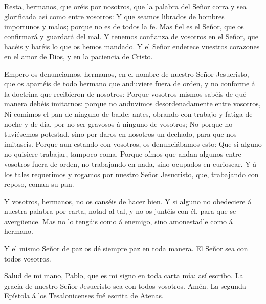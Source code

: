  Resta, hermanos, que oréis por nosotros, que la palabra del
Señor corra y sea glorificada así como entre vosotros:  Y
que seamos librados de hombres importunos y malos; porque no es de todos
la fe.  Mas fiel es el Señor, que os confirmará y guardará
del mal.  Y tenemos confianza de vosotros en el Señor, que
hacéis y haréis lo que os hemos mandado.  Y el Señor
enderece vuestros corazones en el amor de Dios, y en la paciencia de
Cristo.

 Empero os denunciamos, hermanos, en el nombre de nuestro
Señor Jesucristo, que os apartéis de todo hermano que anduviere fuera de
orden, y no conforme á la doctrina que recibieron de nosotros:
 Porque vosotros mismos sabéis de qué manera debéis
imitarnos: porque no anduvimos desordenadamente entre vosotros,
 Ni comimos el pan de ninguno de balde; antes, obrando con
trabajo y fatiga de noche y de día, por no ser gravosos á ninguno de
vosotros;  No porque no tuviésemos potestad, sino por daros
en nosotros un dechado, para que nos imitaseis.  Porque aun
estando con vosotros, os denunciábamos esto: Que si alguno no quisiere
trabajar, tampoco coma.  Porque oímos que andan algunos
entre vosotros fuera de orden, no trabajando en nada, sino ocupados en
curiosear.  Y á los tales requerimos y rogamos por nuestro
Señor Jesucristo, que, trabajando con reposo, coman su pan.

 Y vosotros, hermanos, no os canséis de hacer bien.
 Y si alguno no obedeciere á nuestra palabra por carta,
notad al tal, y no os juntéis con él, para que se avergüence.
 Mas no lo tengáis como á enemigo, sino amonestadle como á
hermano.

 Y el mismo Señor de paz os dé siempre paz en toda manera.
El Señor sea con todos vosotros.

 Salud de mi mano, Pablo, que es mi signo en toda carta
mía: así escribo.  La gracia de nuestro Señor Jesucristo
sea con todos vosotros. Amén. La segunda Epístola á los Tesalonicenses
fué escrita de Atenas.
